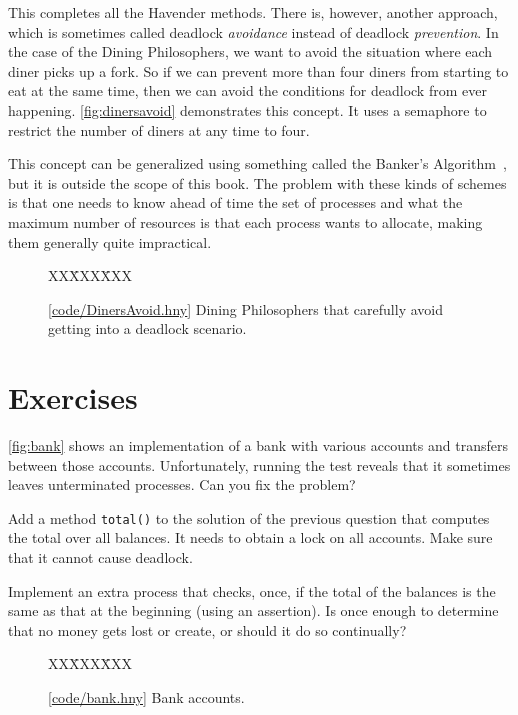 \documentclass{report}
\newcommand{\harmonysource}[1]{
\begin{tabbing}
XX\=XXX\=XXX\kill
    
\end{tabbing}
}
\newcommand{\harmonylink}[1]{%
[\href{https://www.cs.cornell.edu/home/rvr/harmony/#1}{\underline{#1}}]%
}
\newenvironment{code}{
\tcolorbox
}{
\endtcolorbox
}
\begin{document}
This completes all the Havender methods.
There is, however, another approach, which is sometimes called deadlock
\emph{avoidance}
%
instead of deadlock \emph{prevention}.
In the case of the Dining Philosophers, we want to avoid the situation where each
diner picks up a fork.  So if we can prevent more than four diners from starting to
eat at the same time, then we can avoid the conditions for deadlock from ever
happening.
\autoref{fig:dinersavoid} demonstrates this concept.  It uses a semaphore to
restrict the number of diners at any time to four.

This concept can be generalized using something called the
Banker's Algorithm~\cite{EWD108}, but it is outside the scope of this book.
The problem with these kinds of schemes is that one needs to know ahead of time
the set of processes and what the maximum number of resources is that each process
wants to allocate, making them generally quite impractical.

\begin{figure}
\begin{code}
\harmonysource{DinersAvoid}
\end{code}
\caption{\harmonylink{code/DinersAvoid.hny} Dining Philosophers that carefully avoid getting into a deadlock
scenario.}
\label{fig:dinersavoid}
\end{figure}

\section*{Exercises}
\begin{problems}
\item \label{ex:bank} \autoref{fig:bank} shows an implementation of a bank with various
accounts and transfers between those accounts.
Unfortunately, running the test reveals that it sometimes leaves unterminated
processes.  Can you fix the problem?
\item Add a method \texttt{total()} to the solution of the previous question
that computes the total over all balances.
It needs to obtain a lock on all accounts.  Make sure that
it cannot cause deadlock.
\item Implement an extra process that checks, once, if the total of
the balances is the same as that at the beginning (using an assertion).
Is once enough to determine that no money gets lost or create, or should it do
so continually?
\end{problems}

\begin{figure}
\begin{code}
\harmonysource{bank}
\end{code}
\caption{\harmonylink{code/bank.hny} Bank accounts.}
\label{fig:bank}
\end{figure}
\end{document}
